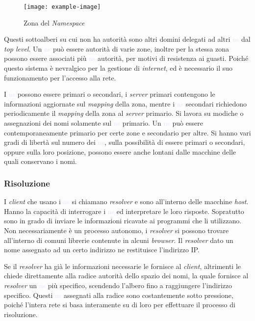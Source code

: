 \documentclass{article}
\numberwithin{equation}{subsection}
\begin{document}
\begin{figure}[H]%
    \centering%
    \texttt{[image: example-image]}%
    \caption{Zona del \textit{Namespace}}%
\end{figure}

Questi sottoalberi su cui non ha autorità sono altri domini delegati ad altri \textcolor{Lavender}{ns} dal \textit{top level}. Un \textcolor{Lavender}{ns} può essere autorità di varie zone, inoltre per la stessa zona 
possono essere associati più \textcolor{Lavender}{ns} autorità, per motivi di resistenza ai guasti. Poiché questo sistema è nevralgico per la gestione di \textit{internet}, ed è necessario il suo 
funzionamento per l'accesso alla rete.  

I \textcolor{Lavender}{ns} possono essere primari o secondari, i \textit{server} primari contengono le informazioni aggiornate sul \textit{mapping} della zona, mentre i \textcolor{Lavender}{ns} secondari richiedono periodicamente 
il \textit{mapping} della zona al \textit{server} primario. Si lavora su modiche o assegnazioni dei nomi solamente sul \textcolor{Lavender}{ns} primario. 
Un \textcolor{Lavender}{ns} può essere contemporaneamente primario per certe zone e secondario per altre. Si hanno vari gradi di libertà sul numero dei \textcolor{Lavender}{ns}, sulla possibilità di essere 
primari o secondari, oppure sulla loro posizione, possono essere anche lontani dalle macchine delle quali conservano i nomi. 

\subsubsection{Risoluzione}

I \textit{client} che usano i \textcolor{Lavender}{ns} si chiamano \textit{resolver} e sono all'interno delle macchine \textit{host}. Hanno la capacità di interrogare i \textcolor{Lavender}{ns} ed interpretare le loro risposte. Sopratutto 
sono in grado di inviare le informazioni ricavate ai programmi che li utilizzano. 
Non necessariamente è un processo autonomo, i \textit{resolver} si possono trovare all'interno di comuni librerie contenute in alcuni \textit{browser}. Il \textit{resolver} dato un nome assegnato ad un certo indirizzo ne restituisce l'indirizzo \textcolor{Bittersweet}{IP}.

Se il \textit{resolver} ha già le informazioni necessarie le fornisce al \textit{client}, altrimenti le chiede direttamente alla radice autorità dello spazio dei nomi, la quale 
fornisce al \textit{resolver} un \textcolor{Lavender}{ns} più specifico, scendendo l'albero fino a raggiungere l'indirizzo specifico. Questi \textcolor{Lavender}{ns} assegnati alla radice sono costantemente 
sotto pressione, poiché l'intera rete si basa interamente su di loro per effettuare il processo di risoluzione. 
\end{document}
